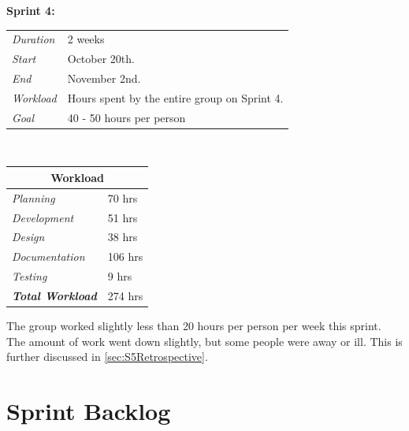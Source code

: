 \begin{minipage}{\linewidth}
\centering
\setlength{\tabcolsep}{22pt}
\textbf{Sprint 4:} 
\smallskip
{}
\begin{tabular}{ |l l| }
	\hline
	\it{Duration} & 2 weeks \\
	\it{Start} & October 20th. \\
	\it{End} & November 2nd. \\
	\it{Workload} & Hours spent by the entire group on Sprint 4. \\
	\it{Goal} & 40 - 50 hours per person \\
	\hline
\end{tabular}
\end{minipage}\\%
%
\begin{minipage}{\linewidth}
\setlength{\tabcolsep}{15pt}
\centering
{}
\begin{tabular}{ |l|l| }
	\hline
	\multicolumn{2}{|c|}{\cellcolor{gray!25} Workload} \\
	\hline
	\it{Planning} & 70 hrs\\
	\it{Development} & 51 hrs\\
	\it{Design} & 38 hrs\\
	\it{Documentation} & 106 hrs\\
	\it{Testing} & 9 hrs\\
	\hline
	\textbf{\textit{Total Workload}} & 274 hrs\\
	\hline
\end{tabular}
\end{minipage}

The group worked slightly less than 20 hours per person per week this sprint. The amount of work went down slightly, but some people were away or ill. This is further discussed in \ref{sec:S5Retrospective}.

\section{Sprint Backlog}
\label{sec:S5Backlog}

